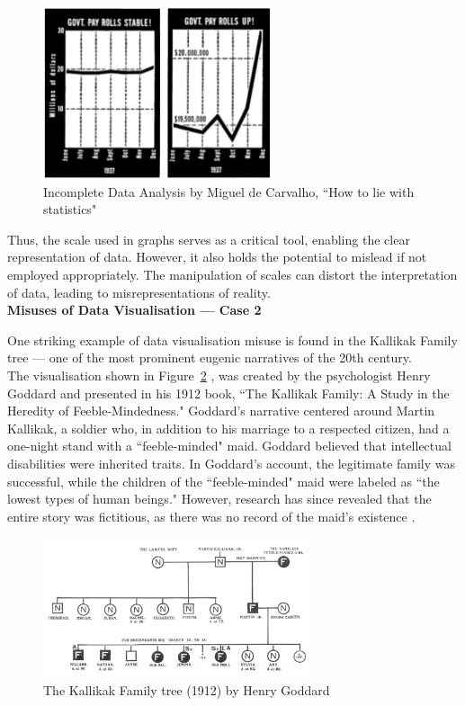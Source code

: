\documentclass{article}\usepackage[]{graphicx}\usepackage[]{xcolor}
\numberwithin{equation}{section}
\begin{document}
\begin{figure}[H]
    \centering
    \includegraphics[width=0.6\textwidth]{image_reference/misuse1.png}
    \caption{Incomplete Data Analysis by Miguel de Carvalho, ``How to lie with statistics"}
    \label{fig:misuse1}
\end{figure}

\noindent 
Thus, the scale used in graphs serves as a critical tool, enabling the clear representation of data. However, it also holds the potential to mislead if not employed appropriately. The manipulation of scales can distort the interpretation of data, leading to misrepresentations of reality.\\

\noindent 
\textbf{Misuses of Data Visualisation — Case 2}

\noindent
One striking example of data visualisation misuse is found in the Kallikak Family tree — one of the most prominent eugenic narratives of the 20th century.\\

\noindent
The visualisation shown in Figure~\ref{fig:familytree} \cite{ktree}, was created by the psychologist Henry Goddard and presented in his 1912 book, ``The Kallikak Family: A Study in the Heredity of Feeble-Mindedness." Goddard's narrative centered around Martin Kallikak, a soldier who, in addition to his marriage to a respected citizen, had a one-night stand with a ``feeble-minded" maid. Goddard believed that intellectual disabilities were inherited traits. In Goddard's account, the legitimate family was successful, while the children of the ``feeble-minded" maid were labeled as ``the lowest types of human beings." However, research has since revealed that the entire story was fictitious, as there was no record of the maid's existence \cite{fakedata}.\\

\begin{figure}[H]
    \centering
    \includegraphics[width=0.7\textwidth]{image_reference/familytree.jpg}
    \caption{The Kallikak Family tree (1912) by Henry Goddard}
    \label{fig:familytree}
\end{figure}
\end{document}
